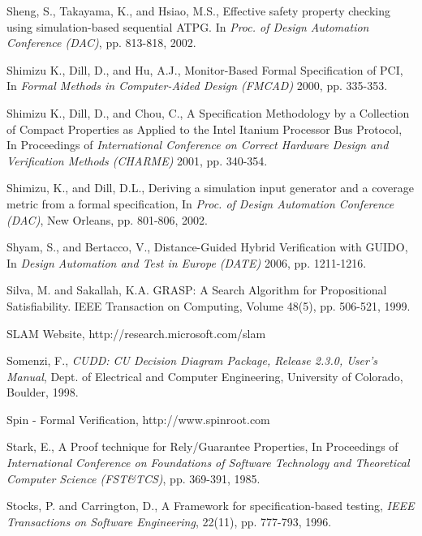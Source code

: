 {\begin{thebibliography}{99}
 Sheng, S., Takayama, K., and Hsiao, M.S., Effective safety
	property checking using simulation-based sequential ATPG. In {\em
	Proc. of Design Automation Conference (DAC)}, pp. 813-818, 2002.

 Shimizu K., Dill, D., and Hu, A.J.,
        Monitor-Based Formal Specification of PCI, In {\em Formal Methods 
	in Computer-Aided Design (FMCAD)} 2000, pp. 335-353.

 Shimizu K., Dill, D., and Chou, C.,
        A Specification Methodology by a
        Collection of Compact Properties as Applied to the Intel
        Itanium Processor Bus Protocol, In 
	Proceedings of {\em International Conference on Correct
        Hardware Design and Verification Methods (CHARME)} 2001, pp. 340-354. 

 Shimizu, K., and Dill, D.L., Deriving a simulation input
        generator and a coverage metric from a formal specification, In
        {\em Proc. of Design Automation Conference (DAC)}, 
        New Orleans, pp. 801-806, 2002.

 Shyam, S., and Bertacco, V., Distance-Guided
        Hybrid Verification with GUIDO, In {\em Design Automation and 
	Test in Europe (DATE)} 2006, pp. 1211-1216.

 Silva, M. and Sakallah, K.A. GRASP: A Search 	
	Algorithm for Propositional Satisfiability. {IEEE Transaction on 
	Computing, Volume 48(5), pp. 506-521, 1999.} 


 SLAM Website, http://research.microsoft.com/slam

 Somenzi, F., {\em CUDD: CU Decision Diagram Package,
	    Release 2.3.0, User's Manual}, Dept. of Electrical and Computer
   	    Engineering, University of Colorado, Boulder, 1998.

 Spin - Formal Verification, http://www.spinroot.com

 Stark, E., A Proof technique for Rely/Guarantee
        Properties, In Proceedings of {\em International Conference on
        Foundations of Software Technology and Theoretical Computer
        Science (FST\&TCS)}, pp. 369-391, 1985. 

 Stocks, P. and Carrington, D., A Framework for
    	specification-based testing, {\em IEEE Transactions on Software 
	Engineering}, 22(11), pp. 777-793, 1996.


\end{thebibliography}}
